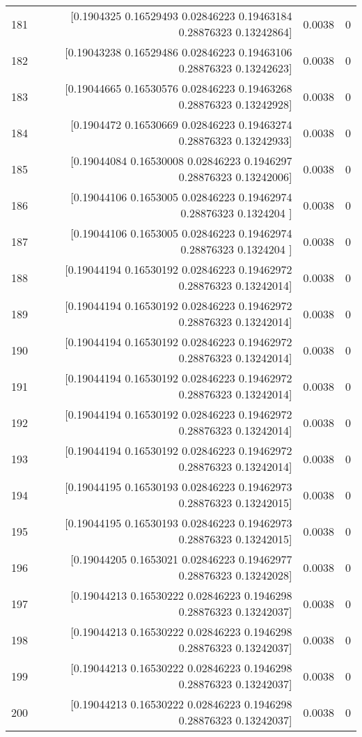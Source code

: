 \begin{longtable}{lrrr}
181 & [0.1904325  0.16529493 0.02846223 0.19463184 0.28876323 0.13242864] & 0.0038 & 0 \\
182 & [0.19043238 0.16529486 0.02846223 0.19463106 0.28876323 0.13242623] & 0.0038 & 0 \\
183 & [0.19044665 0.16530576 0.02846223 0.19463268 0.28876323 0.13242928] & 0.0038 & 0 \\
184 & [0.1904472  0.16530669 0.02846223 0.19463274 0.28876323 0.13242933] & 0.0038 & 0 \\
185 & [0.19044084 0.16530008 0.02846223 0.1946297  0.28876323 0.13242006] & 0.0038 & 0 \\
186 & [0.19044106 0.1653005  0.02846223 0.19462974 0.28876323 0.1324204 ] & 0.0038 & 0 \\
187 & [0.19044106 0.1653005  0.02846223 0.19462974 0.28876323 0.1324204 ] & 0.0038 & 0 \\
188 & [0.19044194 0.16530192 0.02846223 0.19462972 0.28876323 0.13242014] & 0.0038 & 0 \\
189 & [0.19044194 0.16530192 0.02846223 0.19462972 0.28876323 0.13242014] & 0.0038 & 0 \\
190 & [0.19044194 0.16530192 0.02846223 0.19462972 0.28876323 0.13242014] & 0.0038 & 0 \\
191 & [0.19044194 0.16530192 0.02846223 0.19462972 0.28876323 0.13242014] & 0.0038 & 0 \\
192 & [0.19044194 0.16530192 0.02846223 0.19462972 0.28876323 0.13242014] & 0.0038 & 0 \\
193 & [0.19044194 0.16530192 0.02846223 0.19462972 0.28876323 0.13242014] & 0.0038 & 0 \\
194 & [0.19044195 0.16530193 0.02846223 0.19462973 0.28876323 0.13242015] & 0.0038 & 0 \\
195 & [0.19044195 0.16530193 0.02846223 0.19462973 0.28876323 0.13242015] & 0.0038 & 0 \\
196 & [0.19044205 0.1653021  0.02846223 0.19462977 0.28876323 0.13242028] & 0.0038 & 0 \\
197 & [0.19044213 0.16530222 0.02846223 0.1946298  0.28876323 0.13242037] & 0.0038 & 0 \\
198 & [0.19044213 0.16530222 0.02846223 0.1946298  0.28876323 0.13242037] & 0.0038 & 0 \\
199 & [0.19044213 0.16530222 0.02846223 0.1946298  0.28876323 0.13242037] & 0.0038 & 0 \\
200 & [0.19044213 0.16530222 0.02846223 0.1946298  0.28876323 0.13242037] & 0.0038 & 0 \\

\end{longtable}
